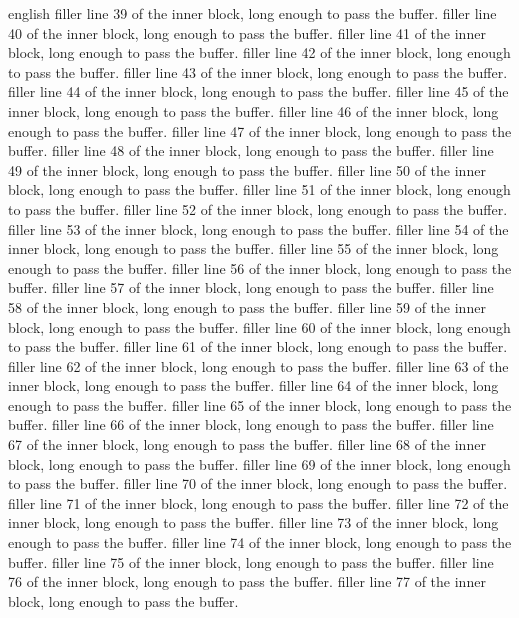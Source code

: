 \begin{onlyin}{english}
filler line 39 of the inner block, long enough to pass the buffer.
filler line 40 of the inner block, long enough to pass the buffer.
filler line 41 of the inner block, long enough to pass the buffer.
filler line 42 of the inner block, long enough to pass the buffer.
filler line 43 of the inner block, long enough to pass the buffer.
filler line 44 of the inner block, long enough to pass the buffer.
filler line 45 of the inner block, long enough to pass the buffer.
filler line 46 of the inner block, long enough to pass the buffer.
filler line 47 of the inner block, long enough to pass the buffer.
filler line 48 of the inner block, long enough to pass the buffer.
filler line 49 of the inner block, long enough to pass the buffer.
filler line 50 of the inner block, long enough to pass the buffer.
filler line 51 of the inner block, long enough to pass the buffer.
filler line 52 of the inner block, long enough to pass the buffer.
filler line 53 of the inner block, long enough to pass the buffer.
filler line 54 of the inner block, long enough to pass the buffer.
filler line 55 of the inner block, long enough to pass the buffer.
filler line 56 of the inner block, long enough to pass the buffer.
filler line 57 of the inner block, long enough to pass the buffer.
filler line 58 of the inner block, long enough to pass the buffer.
filler line 59 of the inner block, long enough to pass the buffer.
filler line 60 of the inner block, long enough to pass the buffer.
filler line 61 of the inner block, long enough to pass the buffer.
filler line 62 of the inner block, long enough to pass the buffer.
filler line 63 of the inner block, long enough to pass the buffer.
filler line 64 of the inner block, long enough to pass the buffer.
filler line 65 of the inner block, long enough to pass the buffer.
filler line 66 of the inner block, long enough to pass the buffer.
filler line 67 of the inner block, long enough to pass the buffer.
filler line 68 of the inner block, long enough to pass the buffer.
filler line 69 of the inner block, long enough to pass the buffer.
filler line 70 of the inner block, long enough to pass the buffer.
filler line 71 of the inner block, long enough to pass the buffer.
filler line 72 of the inner block, long enough to pass the buffer.
filler line 73 of the inner block, long enough to pass the buffer.
filler line 74 of the inner block, long enough to pass the buffer.
filler line 75 of the inner block, long enough to pass the buffer.
filler line 76 of the inner block, long enough to pass the buffer.
filler line 77 of the inner block, long enough to pass the buffer.

\end{onlyin}
